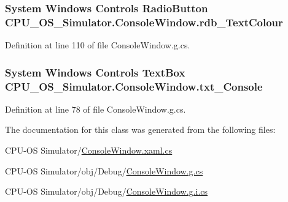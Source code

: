 \subsubsection[{rdb\+\_\+\+Text\+Colour}]{\setlength{\rightskip}{0pt plus 5cm}System Windows Controls Radio\+Button C\+P\+U\+\_\+\+O\+S\+\_\+\+Simulator.\+Console\+Window.\+rdb\+\_\+\+Text\+Colour\hspace{0.3cm}{\ttfamily [package]}}\label{class_c_p_u___o_s___simulator_1_1_console_window_a6086d1a5ddaadd584ec129c7372359e2}


Definition at line 110 of file Console\+Window.\+g.\+cs.

\hypertarget{class_c_p_u___o_s___simulator_1_1_console_window_ad1d4a0c5f573c7e89c8d6ed57d5097e0}{}
\subsubsection[{txt\+\_\+\+Console}]{\setlength{\rightskip}{0pt plus 5cm}System Windows Controls Text\+Box C\+P\+U\+\_\+\+O\+S\+\_\+\+Simulator.\+Console\+Window.\+txt\+\_\+\+Console\hspace{0.3cm}{\ttfamily [package]}}\label{class_c_p_u___o_s___simulator_1_1_console_window_ad1d4a0c5f573c7e89c8d6ed57d5097e0}


Definition at line 78 of file Console\+Window.\+g.\+cs.



The documentation for this class was generated from the following files\+:\begin{DoxyCompactItemize}
\item 
C\+P\+U-\/\+O\+S Simulator/\hyperlink{_console_window_8xaml_8cs}{Console\+Window.\+xaml.\+cs}\item 
C\+P\+U-\/\+O\+S Simulator/obj/\+Debug/\hyperlink{_console_window_8g_8cs}{Console\+Window.\+g.\+cs}\item 
C\+P\+U-\/\+O\+S Simulator/obj/\+Debug/\hyperlink{_console_window_8g_8i_8cs}{Console\+Window.\+g.\+i.\+cs}\end{DoxyCompactItemize}
